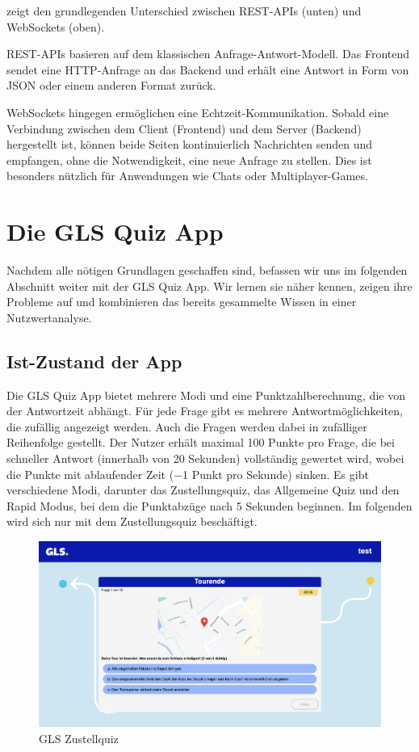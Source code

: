 \documentclass[biblatex]{lni}
\begin{document}
 zeigt den grundlegenden Unterschied zwischen \ac{REST}-\ac{API}s (unten) und WebSockets (oben).

\ac{REST}-\ac{API}s basieren auf dem klassischen Anfrage-Antwort-Modell.
Das Frontend sendet eine \ac{HTTP}-Anfrage an das Backend und erhält eine Antwort in Form von \ac{JSON} oder einem anderen Format zurück.

WebSockets hingegen ermöglichen eine Echtzeit-Kommunikation.
Sobald eine Verbindung zwischen dem Client (Frontend) und dem Server (Backend) hergestellt ist,
können beide Seiten kontinuierlich Nachrichten senden und empfangen, ohne die Notwendigkeit, eine neue Anfrage zu stellen.
Dies ist besonders nützlich für Anwendungen wie Chats oder Multiplayer-Games.

\section{Die GLS Quiz App}

Nachdem alle nötigen Grundlagen geschaffen sind, befassen wir uns im folgenden Abschnitt weiter mit der GLS Quiz App.
Wir lernen sie näher kennen, zeigen ihre Probleme auf und kombinieren das bereits gesammelte Wissen in einer Nutzwertanalyse.

\subsection{Ist-Zustand der App}

Die GLS Quiz App bietet mehrere Modi und eine Punktzahlberechnung,
die von der Antwortzeit abhängt. \cite{GLSQ}
Für jede Frage gibt es mehrere Antwortmöglichkeiten,
die zufällig angezeigt werden.
Auch die Fragen werden dabei in zufälliger Reihenfolge gestellt.
Der Nutzer erhält maximal 100 Punkte pro Frage,
die bei schneller Antwort (innerhalb von 20 Sekunden) vollständig gewertet wird,
wobei die Punkte mit ablaufender Zeit (−1 Punkt pro Sekunde) sinken.
Es gibt verschiedene Modi, darunter das Zustellungsquiz,
das Allgemeine Quiz und den Rapid Modus, bei dem die Punktabzüge nach 5 Sekunden beginnen.
Im folgenden wird sich nur mit dem Zustellungsquiz beschäftigt.

\begin{figure}
  \centering
  \includegraphics[width=.8\textwidth]{gls-trainee}
  \caption{GLS Zustellquiz}
  \label{fig:gls-trainee}
\end{figure}
\end{document}
